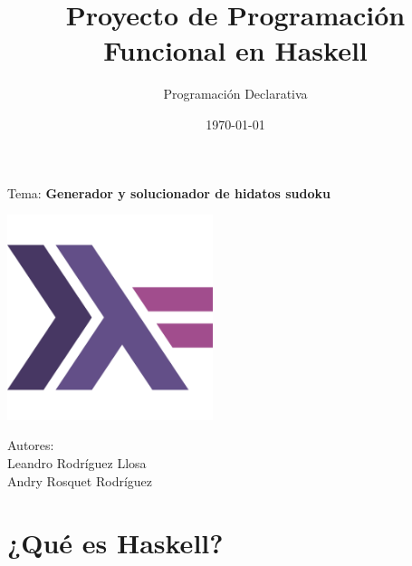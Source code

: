 \documentclass[10pt]{amsart}
\title{Proyecto de Programaci\'on Funcional en Haskell}
\author{Programaci\'on Declarativa}
\date{\today}
\begin{document}
	\begin{titlepage}
		\clearpage
		\maketitle
		
		\vspace{3em}
		\begin{center}
			Tema: \textbf{Generador y solucionador de hidatos sudoku} 	

                \vspace{6em}
                \begin{center}
        		\includegraphics[width=6cm]{haskell.png}
        	\end{center}

			\vspace{6em}
			Autores: \\
			Leandro Rodríguez Llosa \\
			Andry Rosquet Rodríguez
		\end{center}
		\thispagestyle{empty}
	\end{titlepage}

        \normalsize
 
	\small

        \section*{¿Qu\'e es Haskell?}
       
\end{document}
